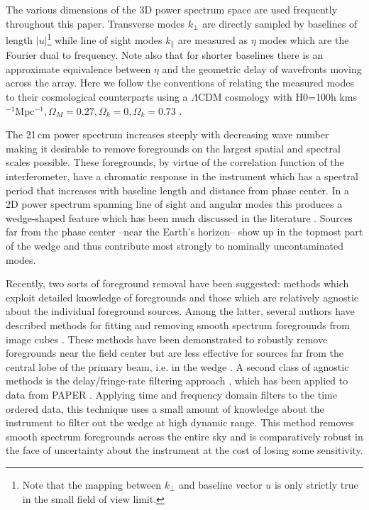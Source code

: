 \documentclass[twolcolumn,iop]{emulateapj}
\begin{document}
 The various dimensions of the 3D power spectrum space are used frequently throughout this paper.  Transverse modes $k_\perp$ are directly sampled by baselines of length $|u|$\footnote{Note that the mapping between $k_\perp$ and baseline vector $u$ is only strictly true in the small field of view limit.} while line of sight modes $k_\parallel$ are measured as $\eta$ modes which are the Fourier dual to frequency. Note also that for shorter baselines there is an approximate equivalence between $\eta$ and the geometric delay of wavefronts moving across the array. Here we follow the conventions of \cite{Furlanetto:2006p2267} relating the measured modes to their cosmological counterparts using  a $\Lambda$CDM cosmology with H0=100h kms$^{-1}$Mpc$^{-1}, \Omega_M=0.27,\Omega_k=0, \Omega_k=0.73$ \citep{2013ApJS..208...19H_wmap9_parameters}. 

The 21\,cm power spectrum increases steeply with decreasing wave number making it desirable to remove foregrounds on the largest spatial and spectral scales possible.   These foregrounds, by virtue of the correlation function of the interferometer, have a chromatic response in the instrument which has a spectral period that increases with baseline length and distance from phase center. In a 2D power spectrum spanning line of sight and angular modes this produces a wedge-shaped feature which has been much discussed in the literature \cite{Datta:2010p8781,Vedantham:2012p10297,Parsons:2012p8896,Pober:2013p9942,Morales:2012p8790,2014PhRvD..90b3018L,2014PhRvD..90b3019L,Trott:2012p10466,2015ApJ...804...14T}. Sources far from the phase center --near the Earth's horizon-- show up in the topmost part of the wedge and thus contribute most strongly to nominally uncontaminated modes.   


 Recently, two sorts of foreground removal have been suggested: methods which exploit detailed knowledge of foregrounds and those which are relatively agnostic about the individual foreground sources. Among the latter, several authors have described methods for fitting and removing smooth spectrum foregrounds from image cubes  \cite{Morales:2006p1903,Bowman:2009p7816,Liu:2009p4762,Liu:2011p8763,2012MNRAS.Chapman.423.2518C,Chapman:2013p10379,Dillon:2013p10497,Yatawatta:2013p9699}. These methods have been demonstrated to robustly remove foregrounds near the field center but are less effective for sources far from the central lobe of the primary beam, i.e. in the wedge \citep{2015ApJ...804...14T,2015ApJ...807L..28T,Pober:2016ApJ...819....8P}.  A second class of agnostic methods is the delay/fringe-rate filtering approach \citep{Parsons:2012p8896,2014PhRvD..90b3018L,2014PhRvD..90b3019L}, which has been applied to data from PAPER \citep{Parsons:2014p10499,	2015ApJ...809...61A,2015ApJ...801...51J}.  Applying time and frequency domain filters to the time ordered data, this technique uses a small amount of knowledge about the instrument to filter out the wedge at high dynamic range.  This method removes smooth spectrum foregrounds across the entire sky and is comparatively robust in the face of uncertainty about the instrument at the cost of losing some sensitivity.  
 
\end{document}
